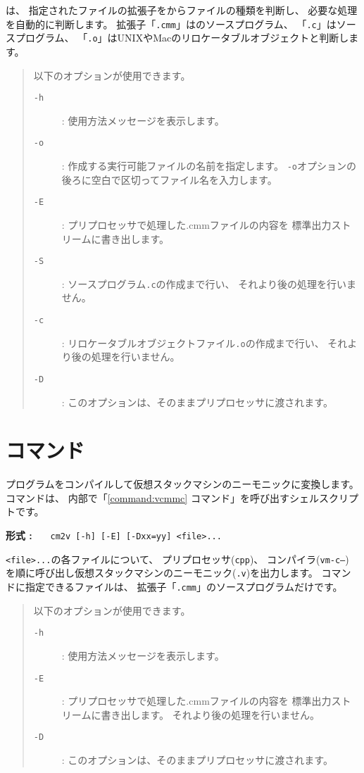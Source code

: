 {\cmc}は、
指定されたファイルの拡張子をからファイルの種類を判断し、
必要な処理を自動的に判断します。
拡張子「{\tt .cmm}」は{\cmml}のソースプログラム、
「{\tt .c}」は{\cl}ソースプログラム、
「{\tt .o}」はUNIXやMacのリロケータブルオブジェクトと判断します。

\begin{quote}
\hspace{-1em}以下のオプションが使用できます。

\begin{description}
\item[{\tt -h}] : 使用方法メッセージを表示します。
\item[{\tt -o}] : 作成する実行可能ファイルの名前を指定します。
{\tt -o}オプションの後ろに空白で区切ってファイル名を入力します。
\item[{\tt -E}] : プリプロセッサで処理した{.cmm}ファイルの内容を
標準出力ストリームに書き出します。
\item[{\tt -S}] : {\cl}ソースプログラム{\tt .c}の作成まで行い、
それより後の処理を行いません。
\item[{\tt -c}] : リロケータブルオブジェクトファイル{\tt .o}の作成まで行い、
それより後の処理を行いません。
\item[{\tt -D}] : このオプションは、そのままプリプロセッサに渡されます。
\end{description}
\end{quote}

\section{{\cmv}コマンド}

{\cmm}プログラムをコンパイルして仮想スタックマシンのニーモニックに変換します。
{\cmv}コマンドは、
内部で「\ref{command:vcmmc} {\vcmmc}コマンド」を呼び出すシェルスクリプトです。

\begin{flushleft}
{\bf 形式 : }~~~\verb/cm2v [-h] [-E] [-Dxx=yy] <file>.../
\end{flushleft}

{\tt <file>...}の各ファイルについて、
プリプロセッサ({\tt cpp})、
コンパイラ({\tt vm-c--})
を順に呼び出し仮想スタックマシンのニーモニック({\tt .v})を出力します。
{\cmv}コマンドに指定できるファイルは、
拡張子「{\tt .cmm}」の{\cmml}ソースプログラムだけです。

\begin{quote}
\hspace{-1em}以下のオプションが使用できます。

\begin{description}
\item[{\tt -h}] : 使用方法メッセージを表示します。
\item[{\tt -E}] : プリプロセッサで処理した{.cmm}ファイルの内容を
標準出力ストリームに書き出します。
それより後の処理を行いません。
\item[{\tt -D}] : このオプションは、そのままプリプロセッサに渡されます。
\end{description}
\end{quote}

